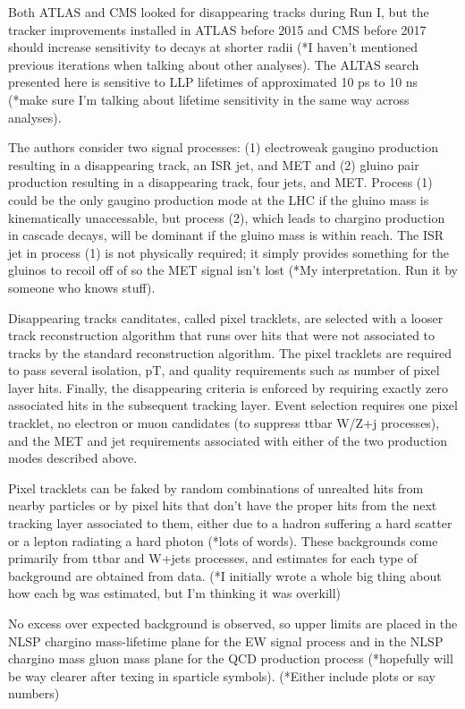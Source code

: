 \documentclass[12pt]{article}
\begin{document}
    Both ATLAS and CMS looked for disappearing tracks during Run I, but the tracker improvements installed in ATLAS before 2015 and CMS before 2017 should increase sensitivity to decays at shorter radii (*I haven't mentioned previous iterations when talking about other analyses). The ALTAS search presented here is sensitive to LLP lifetimes of approximated 10 ps to 10 ns (*make sure I'm talking about lifetime sensitivity in the same way across analyses).

    The authors consider two signal processes: (1) electroweak gaugino production resulting in a disappearing track, an ISR jet, and MET and (2) gluino pair production resulting in a disappearing track, four jets, and MET. Process (1) could be the only gaugino production mode at the LHC if the gluino mass is kinematically unaccessable, but process (2), which leads to chargino production in cascade decays, will be dominant if the gluino mass is within reach. The ISR jet in process (1) is not physically required; it simply provides something for the gluinos to recoil off of so the MET signal isn't lost (*My interpretation. Run it by someone who knows stuff).

    Disappearing tracks canditates, called pixel tracklets, are selected with a looser track reconstruction algorithm that runs over hits that were not associated to tracks by the standard reconstruction algorithm. The pixel tracklets are required to pass several isolation, pT, and quality requirements such as number of pixel layer hits. Finally, the disappearing criteria is enforced by requiring exactly zero associated hits in the subsequent tracking layer. Event selection requires one pixel tracklet, no electron or muon candidates (to suppress ttbar W/Z+j processes), and the MET and jet requirements associated with either of the two production modes described above.
    
    Pixel tracklets can be faked by random combinations of unrealted hits from nearby particles or by pixel hits that don't have the proper hits from the next tracking layer associated to them, either due to a hadron suffering a hard scatter or a lepton radiating a hard photon (*lots of words). These backgrounds come primarily from ttbar and W+jets processes, and estimates for each type of background are obtained from data. (*I initially wrote a whole big thing about how each bg was estimated, but I'm thinking it was overkill)

    No excess over expected background is observed, so upper limits are placed in the NLSP chargino mass-lifetime plane for the EW signal process and in the NLSP chargino mass gluon mass plane for the QCD production process (*hopefully will be way clearer after texing in sparticle symbols). (*Either include  plots or say numbers)
\end{document}
